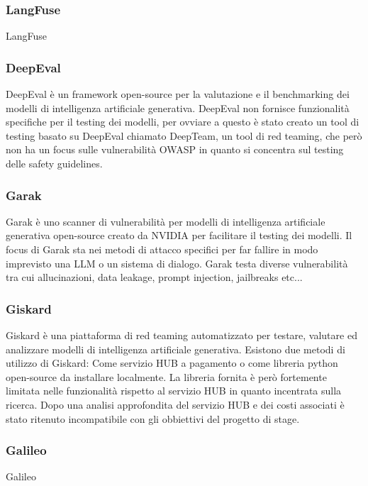 \subsubsection*{LangFuse}
LangFuse

\subsubsection*{DeepEval}
DeepEval è un framework open-source per la valutazione e il benchmarking dei modelli di intelligenza artificiale generativa. DeepEval non fornisce funzionalità specifiche per il testing dei modelli, per ovviare a questo è stato creato un tool di testing basato su DeepEval chiamato DeepTeam, un tool di red teaming, che però non ha un focus sulle vulnerabilità OWASP in quanto si concentra sul testing delle safety guidelines.

\subsubsection*{Garak}
Garak è uno scanner di vulnerabilità per modelli di intelligenza artificiale generativa open-source creato da NVIDIA per facilitare il testing dei modelli. Il focus di Garak sta nei metodi di attacco specifici per far fallire in modo imprevisto una LLM o un sistema di dialogo. Garak testa diverse vulnerabilità tra cui allucinazioni, data leakage, prompt injection, jailbreaks etc...

\subsubsection*{Giskard}
Giskard è una piattaforma di red teaming automatizzato per testare, valutare ed analizzare modelli di intelligenza artificiale generativa. Esistono due metodi di utilizzo di Giskard: Come servizio HUB a pagamento o come libreria python open-source da installare localmente. La libreria fornita è però fortemente limitata nelle funzionalità rispetto al servizio HUB in quanto incentrata sulla ricerca. Dopo una analisi approfondita del servizio HUB e dei costi associati è stato ritenuto incompatibile con gli obbiettivi del progetto di stage.

\subsubsection*{Galileo}
Galileo 

